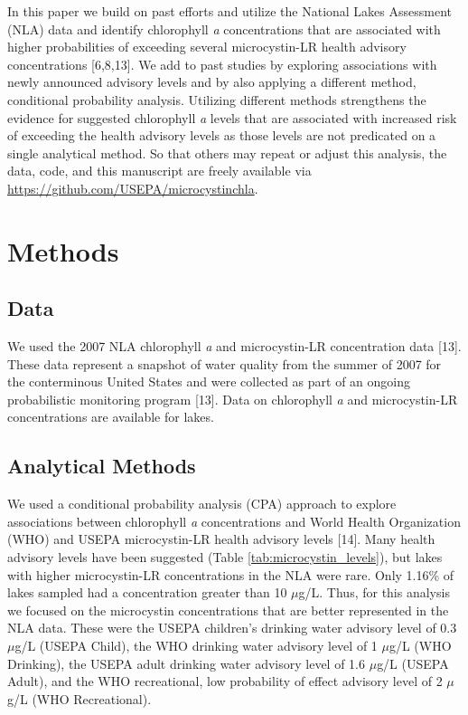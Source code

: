 \documentclass[10pt,a4paper,twocolumn]{article}
\begin{document}
In this paper we build on past efforts and utilize the National Lakes
Assessment (NLA) data and identify chlorophyll \emph{a} concentrations
that are associated with higher probabilities of exceeding several
microcystin-LR health advisory concentrations {[}6,8,13{]}. We add to
past studies by exploring associations with newly announced advisory
levels and by also applying a different method, conditional probability
analysis. Utilizing different methods strengthens the evidence for
suggested chlorophyll \emph{a} levels that are associated with increased
risk of exceeding the health advisory levels as those levels are not
predicated on a single analytical method. So that others may repeat or
adjust this analysis, the data, code, and this manuscript are freely
available via
\href{https://github.com/USAPE/microcystinchla}{\url{https://github.com/USEPA/microcystinchla}}.

\section{Methods}\label{methods}

\subsection{Data}\label{data}

We used the 2007 NLA chlorophyll \emph{a} and microcystin-LR
concentration data {[}13{]}. These data represent a snapshot of water
quality from the summer of 2007 for the conterminous United States and
were collected as part of an ongoing probabilistic monitoring program
{[}13{]}. Data on chlorophyll \emph{a} and microcystin-LR concentrations
are available for lakes.

\subsection{Analytical Methods}\label{analytical-methods}

We used a conditional probability analysis (CPA) approach to explore
associations between chlorophyll \emph{a} concentrations and World
Health Organization (WHO) and USEPA microcystin-LR health advisory
levels {[}14{]}. Many health advisory levels have been suggested (Table
\ref{tab:microcystin_levels}), but lakes with higher microcystin-LR
concentrations in the NLA were rare. Only 1.16\% of lakes sampled had a
concentration greater than 10 \(\mu\)g/L. Thus, for this analysis we
focused on the microcystin concentrations that are better represented in
the NLA data. These were the USEPA children's drinking water advisory
level of 0.3 \(\mu\)g/L (USEPA Child), the WHO drinking water advisory
level of 1 \(\mu\)g/L (WHO Drinking), the USEPA adult drinking water
advisory level of 1.6 \(\mu\)g/L (USEPA Adult), and the WHO
recreational, low probability of effect advisory level of 2 \(\mu\)g/L
(WHO Recreational).
\end{document}
